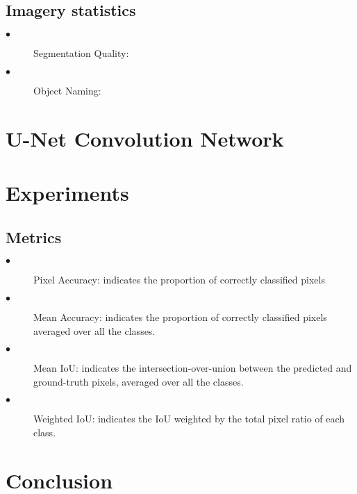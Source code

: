 \documentclass[10pt,twocolumn]{article}
\begin{document}
	\subsection{Imagery statistics}
		\begin{description}
		  \item[$\bullet$] Segmentation Quality: %
		  \item[$\bullet$] Object Naming: %
		\end{description}

\section{U-Net Convolution Network}

\section{Experiments}
	\subsection{Metrics}
		\begin{description}
			\item[$\bullet$] Pixel Accuracy: indicates the proportion of correctly classified pixels
			\item[$\bullet$] Mean Accuracy: indicates the proportion of correctly classified pixels averaged over all the classes.
			\item[$\bullet$] Mean IoU: indicates the intersection-over-union between the predicted and ground-truth pixels, averaged over all the classes.
			\item[$\bullet$] Weighted IoU: indicates the IoU weighted by the total pixel ratio of each class.
		\end{description}


\section{Conclusion}
\end{document}
